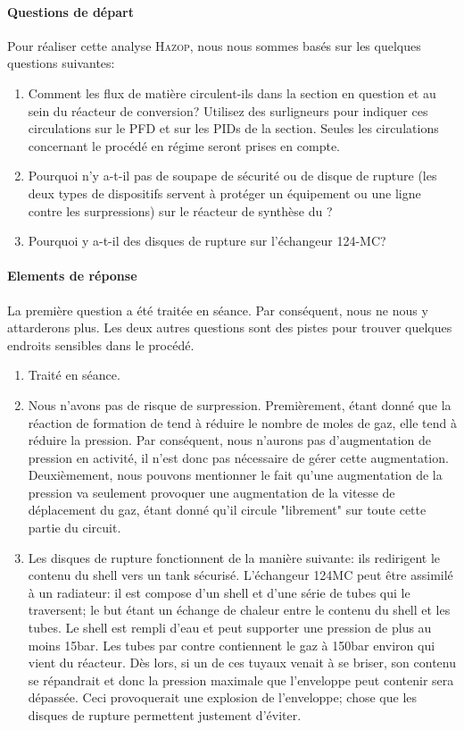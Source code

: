 \paragraph{Questions de départ} Pour réaliser cette analyse \textsc{Hazop}, nous nous sommes basés sur les quelques questions 
suivantes:
\begin{enumerate}
\item Comment les flux de matière circulent-ils dans la section en question et au sein du réacteur de conversion?
Utilisez des surligneurs pour indiquer ces circulations sur le PFD et sur les PIDs de la section. Seules
les circulations concernant le procédé en régime seront prises en compte.
\item Pourquoi n’y a-t-il pas de soupape de sécurité ou de disque de rupture (les deux types de dispositifs
servent à protéger un équipement ou une ligne contre les surpressions) sur le réacteur de synthèse du ?
\item Pourquoi y a-t-il des disques de rupture sur l’échangeur 124-MC?
\end{enumerate}

\paragraph{Elements de réponse} La première question a été traitée en séance. Par conséquent, nous ne nous y attarderons 
plus. Les deux autres questions sont des pistes pour trouver quelques endroits sensibles dans le procédé.

\begin{enumerate}
\item Traité en séance.
\item Nous n'avons pas de risque de surpression. Premièrement, étant donné que la réaction de formation de  tend à
réduire le nombre de moles de gaz, elle tend à réduire la pression. Par conséquent, nous n'aurons pas d'augmentation de
pression en activité, il n'est donc pas nécessaire de gérer cette augmentation. Deuxièmement, nous pouvons mentionner le
fait qu'une augmentation de la pression va seulement provoquer une augmentation de la vitesse de déplacement du gaz, étant
donné qu'il circule "librement" sur toute cette partie du circuit.
\item Les disques de rupture fonctionnent de la manière suivante: ils
redirigent le contenu du shell vers un tank sécurisé. L'échangeur 124MC peut être assimilé à un radiateur: 
il est compose d'un shell et d'une série de tubes qui le traversent; le but étant un échange de chaleur entre le 
contenu du shell et les tubes. Le shell est rempli d'eau et peut supporter une pression de plus au moins \unit{15}{bar}. 
Les tubes par contre contiennent le gaz à \unit{150}{bar} environ qui vient du réacteur. Dès lors, si un de ces tuyaux 
venait à se briser, son contenu se répandrait et donc la pression maximale que l'enveloppe peut contenir sera dépassée. 
Ceci provoquerait une explosion de l'enveloppe; chose que les disques de rupture permettent justement d'éviter. 
\end{enumerate}

